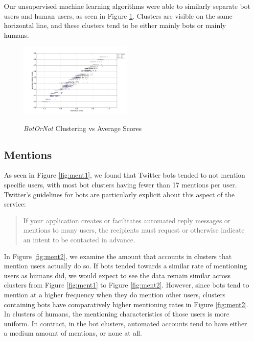 \documentclass{sig-alternate-05-2015}
\begin{document}
Our unsupervised machine learning algorithms were able to similarly separate bot users and human users, as seen in Figure \ref{fig:clustscore}. Clusters are visible on the same horizontal line, and these clusters tend to be either mainly bots or mainly humans.

\begin{figure}[h!]
	\caption{\emph{BotOrNot} Clustering vs Average Scores}
	\centering
		\includegraphics[width=0.5\textwidth]{imgs/ourscorevssubscore}
	\label{fig:clustscore}
\end{figure}

\subsection{Mentions}
As seen in Figure \ref{fig:ment1}, we found that Twitter bots tended to not mention specific users, with most bot clusters having fewer than 17 mentions per user. Twitter's guidelines for bots are particularly explicit about this aspect of the service:

\begin{quote}If your application creates or facilitates automated reply messages or mentions to many users, the recipients must request or otherwise indicate an intent to be contacted in advance.\cite{twitter:automation}\end{quote}

In Figure \ref{fig:ment2}, we examine the amount that accounts in clusters that mention users actually do so. If bots tended towards a similar rate of mentioning users as humans did, we would expect to see the data remain similar across clusters from Figure \ref{fig:ment1} to Figure \ref{fig:ment2}. However, since bots tend to mention at a higher frequency when they do mention other users, clusters containing bots have comparatively higher mentioning rates in Figure \ref{fig:ment2}. In clusters of humans, the mentioning characteristics of those users is more uniform. In contract, in the bot clusters, automated accounts tend to have either a medium amount of mentions, or none at all.
\end{document}
